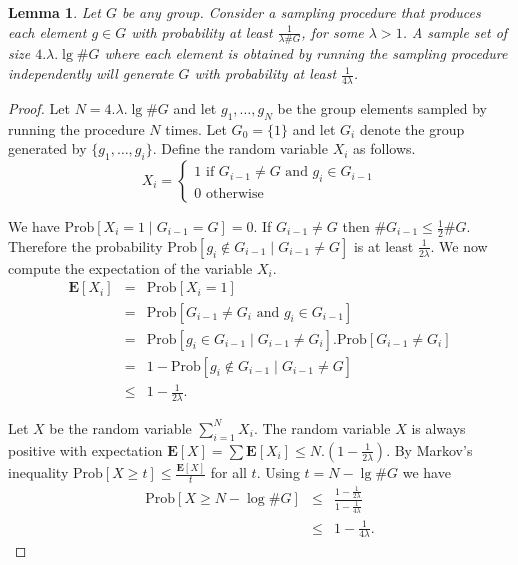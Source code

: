 \documentclass[11pt]{madras}%
\newtheorem{lemma}[theorem]{Lemma}
\theoremstyle{remark}
\begin{document}
\begin{lemma}\label{lem-samp-group}
  Let $G$ be any group. Consider a sampling procedure that produces
  each element $g \in G$ with probability at least $\frac{1}{\lambda
    \# G}$, for some $\lambda > 1$. A sample set of size $4.\lambda
  .\lg{\# G}$ where each element is obtained by running the sampling
  procedure independently will generate $G$ with probability at least
  $\frac{1}{4\lambda}$.
\end{lemma}
\begin{proof}
  Let $N = 4.\lambda . \lg{\# G}$ and let $g_1,\ldots,g_N$ be the
  group elements sampled by running the procedure $N$ times. Let $G_0
  = \{ 1 \}$ and let $G_i$ denote the group generated by $\{
  g_1,\ldots,g_i\}$. Define the random variable $X_i$ as follows.
  \[
  X_i = \left\{ \begin{array}{l}
      1 \textrm{ if } G_{i-1} \neq G \textrm{ and } g_i \in G_{i-1}\\
      0 \textrm{ otherwise}
    \end{array}
  \right.
  \]

  We have $\mathrm{Prob}[X_i = 1 \mid G_{i-1} = G] = 0$. If $G_{i-1}
  \neq G$ then $\# G_{i-1} \leq \frac{1}{2}\#G$. Therefore the
  probability $\mathrm{Prob}[g_i \not\in G_{i-1}\mid G_{i-1} \neq G]$
  is at least $\frac{1}{2\lambda}$.  We now compute the expectation of
  the variable $X_i$.
  \begin{eqnarray*}
    \mathbf{E}[X_i] &=& \mathrm{Prob}[X_i = 1]\\
    & = & \mathrm{Prob}[G_{i-1} \neq G_i \textrm{ and } g_i \in G_{i-1}]\\
    & = & \mathrm{Prob}[g_i \in G_{i-1}\mid G_{i-1} \neq G_i].
    \mathrm{Prob}[ G_{i-1} \neq G_i]\\
    &=& 1 - \mathrm{Prob}[g_i \not\in G_{i-1} \mid G_{i-1} \neq G] \\
    &\leq&  1 - \frac{1}{2\lambda}.
\end{eqnarray*}

Let $X$ be the random variable $\sum_{i=1}^N X_i$.  The random
variable $X$ is always positive with expectation $\mathbf{E}[X] = \sum
\mathbf{E}[X_i] \leq N .  (1 - \frac{1}{2\lambda})$. By Markov's
inequality $\mathrm{Prob}[X \geq t] \leq \frac{\mathbf{E}[X]}{t}$ for
all $t$.  Using $t = N - \lg{\# G}$ we have
\begin{eqnarray*}
  \mathrm{Prob}[X \geq N - \log{\# G}] & \leq &\frac{1 - 
    \frac{1}{2\lambda}} {1 - \frac{1}{4 \lambda}}\\
  &\leq &1 - \frac{1}{4 \lambda}.
\end{eqnarray*}



\end{proof}
\end{document}
